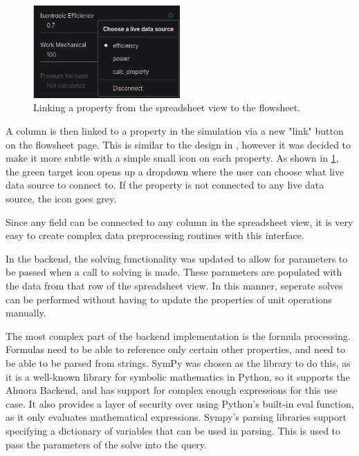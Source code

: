 \begin{figure}[h]
    \centering
    \includegraphics[width=0.5\textwidth]{link_property.png}
    \caption{Linking a property from the spreadsheet view to the flowsheet.}
    \label{fig:linkproperty}
\end{figure}

A column is then linked to a property in the simulation via a new "link" button on the flowsheet page. This is similar to the design in , however it was decided to make it more subtle with a simple small icon on each property. As shown in \cref{fig:linkproperty}, the green target icon opens up a dropdown where the user can choose what live data source to connect to. If the property is not connected to any live data source, the icon goes grey.

Since any field can be connected to any column in the spreadsheet view, it is very easy to create complex data preprocessing routines with this interface.



In the backend, the solving functionality was updated to allow for parameters to be passed when a call to solving is made. These parameters are populated with the data from that row of the spreadsheet view. In this manner, seperate solves can be performed without having to update the properties of unit operations manually.


The most complex part of the backend implementation is the formula processing. Formulas need to be able to reference only certain other properties, and need to be able to be parsed from strings. SymPy was chosen as the library to do this, as it is a well-known library for symbolic mathematics in Python, so it supports the Ahuora Backend, and has support for complex enough expressions for this use case. It also provides a layer of security over using Python's built-in eval function, as it only evaluates mathematical expressions.
Sympy's parsing libraries support specifying a dictionary of variables that can be used in parsing. This is used to pass the parameters of the solve into the query.

